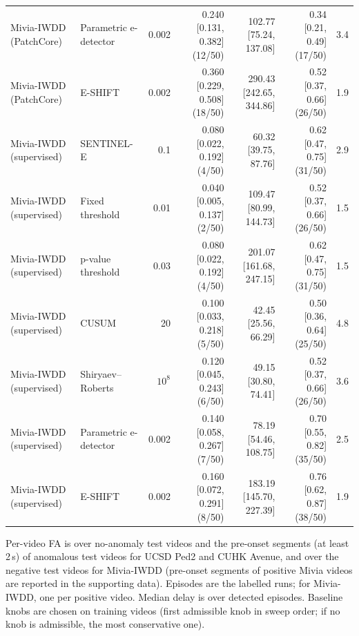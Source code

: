 \begin{table}[t]
{\begin{tabular}{llrrrrr}
Mivia-IWDD (PatchCore) & Parametric e-detector & 0.002 & 0.240 [0.131, 0.382] (12/50) & 102.77 [75.24, 137.08] & 0.34 [0.21, 0.49] (17/50) & 3.4 \\
Mivia-IWDD (PatchCore) & E-SHIFT & 0.002 & 0.360 [0.229, 0.508] (18/50) & 290.43 [242.65, 344.86] & 0.52 [0.37, 0.66] (26/50) & 1.9 \\
Mivia-IWDD (supervised) & SENTINEL-E & 0.1 & 0.080 [0.022, 0.192] (4/50) & 60.32 [39.75, 87.76] & 0.62 [0.47, 0.75] (31/50) & 2.9 \\
Mivia-IWDD (supervised) & Fixed threshold & 0.01 & 0.040 [0.005, 0.137] (2/50) & 109.47 [80.99, 144.73] & 0.52 [0.37, 0.66] (26/50) & 1.5 \\
Mivia-IWDD (supervised) & p-value threshold & 0.03 & 0.080 [0.022, 0.192] (4/50) & 201.07 [161.68, 247.15] & 0.62 [0.47, 0.75] (31/50) & 1.5 \\
Mivia-IWDD (supervised) & CUSUM & 20 & 0.100 [0.033, 0.218] (5/50) & 42.45 [25.56, 66.29] & 0.50 [0.36, 0.64] (25/50) & 4.8 \\
Mivia-IWDD (supervised) & Shiryaev--Roberts & $10^{8}$ & 0.120 [0.045, 0.243] (6/50) & 49.15 [30.80, 74.41] & 0.52 [0.37, 0.66] (26/50) & 3.6 \\
Mivia-IWDD (supervised) & Parametric e-detector & 0.002 & 0.140 [0.058, 0.267] (7/50) & 78.19 [54.46, 108.75] & 0.70 [0.55, 0.82] (35/50) & 2.5 \\
Mivia-IWDD (supervised) & E-SHIFT & 0.002 & 0.160 [0.072, 0.291] (8/50) & 183.19 [145.70, 227.39] & 0.76 [0.62, 0.87] (38/50) & 1.9 \\
\bottomrule
\end{tabular}}
\begin{minipage}{\linewidth}\vspace{2pt}\footnotesize Per-video FA is over no-anomaly test videos and the pre-onset segments (at least 2\,s) of anomalous test videos for UCSD Ped2 and CUHK Avenue, and over the negative test videos for Mivia-IWDD (pre-onset segments of positive Mivia videos are reported in the supporting data). Episodes are the labelled runs; for Mivia-IWDD, one per positive video. Median delay is over detected episodes. Baseline knobs are chosen on training videos (first admissible knob in sweep order; if no knob is admissible, the most conservative one).\end{minipage}
\end{table}
